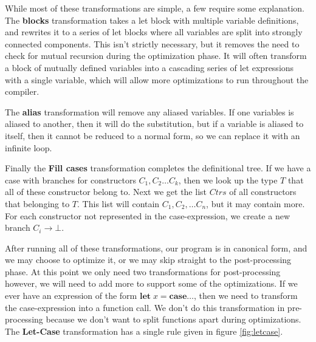 \documentclass{book}
\theoremstyle{definition}
\newcommand{\Conid}[1]{\mathit{#1}}
\newcommand{\Varid}[1]{\mathit{#1}}
\begin{document}
While most of these transformations are simple,
a few require some explanation.
The \textbf{blocks} transformation takes a let block with multiple variable definitions,
and rewrites it to a series of let blocks where all variables are split into
strongly connected components.
This isn't strictly necessary,
but it removes the need to check for mutual recursion during the optimization phase.
It will often transform a block of mutually defined variables into a cascading 
series of let expressions with a single variable,
which will allow more optimizations to run throughout the compiler.

The \textbf{alias} transformation will remove any aliased variables.
If one variables is aliased to another, then it will do the substitution,
but if a variable is aliased to itself, then it cannot be reduced to a normal form,
so we can replace it with an infinite loop.


Finally the \textbf{Fill cases} transformation completes the definitional tree.
If we have a case with branches for constructors \ensuremath{\Conid{C}_{\mathrm{1}},\Conid{C}_{\mathrm{2}}\ldots \Conid{C}_{\Varid{k}}},
then we look up the type \ensuremath{\Conid{T}} that all of these constructor belong to.
Next we get the list \ensuremath{\Conid{Ctrs}} of all constructors that belonging to \ensuremath{\Conid{T}}.
This list will contain \ensuremath{\Conid{C}_{\mathrm{1}},\Conid{C}_{\mathrm{2}},\ldots \Conid{C}_{\Varid{n}}}, but it may contain more.
For each constructor not represented in the case-expression,
we create a new branch \ensuremath{\Conid{C}_{\Varid{i}}\to \bot }.

After running all of these transformations, our program is in canonical form,
and we may choose to optimize it, or we may skip straight to the post-processing phase.
At this point we only need two transformations for post-processing
however, we will need to add more to support some of the optimizations.
If we ever have an expression of the form \ensuremath{\mathbf{let}\;\Varid{x}\mathrel{=}\mathbf{case}\ldots }, then we need to transform the
case-expression into a function call.
We don't do this transformation in pre-processing
because we don't want to split functions apart during optimizations.
The \textbf{Let-Case} transformation has a single rule given in figure \ref{fig:letcase}.
\end{document}

